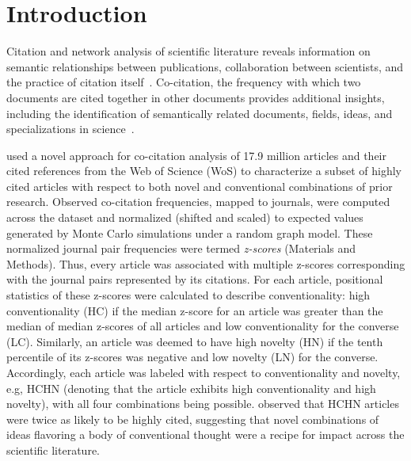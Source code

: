 \documentclass[NETN]{stjour}
\begin{document}


\section{Introduction}
Citation and network analysis of  scientific literature reveals information on semantic relationships between publications, collaboration between scientists, and the practice of citation itself~\citep{garfield_citation_1955,de_solla_price_networks_1965,newman_structure_2001,Shi:2010:CHI:1816123.1816131,patience_pmid28560354}. Co-citation, the frequency with which two documents are cited together in other documents provides additional insights, including the identification of semantically related documents, fields, ideas, and specializations in science~\citep{small_co-citation_1973,marshakova-shaikevich_co-citation_1973,boyack_co-citation_2010}. 

\citep{uzzi_atypical_2013} used a novel approach for co-citation analysis of 17.9 million articles and their cited references from the Web of Science (WoS)  to characterize a subset of highly cited articles with respect to both novel and conventional combinations of prior research. Observed co-citation frequencies, mapped to journals, were computed across the dataset and normalized (shifted and scaled) to expected values generated by Monte Carlo simulations under a random graph model. These normalized journal pair frequencies were termed \emph{z-scores} (Materials and Methods). Thus, every article was associated with multiple z-scores corresponding with the journal pairs represented by its citations. For each article, positional statistics of these z-scores were calculated to describe conventionality: high conventionality (HC) if the median z-score for an article was greater than the median of median z-scores of all articles and low conventionality for the converse (LC). Similarly,  an article was deemed to have high novelty (HN) if the tenth percentile of its z-scores  was negative and low novelty (LN) for the converse. Accordingly, each article was labeled with respect to conventionality and novelty, e.g, HCHN (denoting that the article exhibits high conventionality and high novelty), with all four combinations being possible. 
\citep{uzzi_atypical_2013} observed that HCHN articles were twice as likely to be highly cited, suggesting that novel combinations of ideas flavoring a body of conventional thought were a recipe for impact across the scientific literature. 
\end{document}
